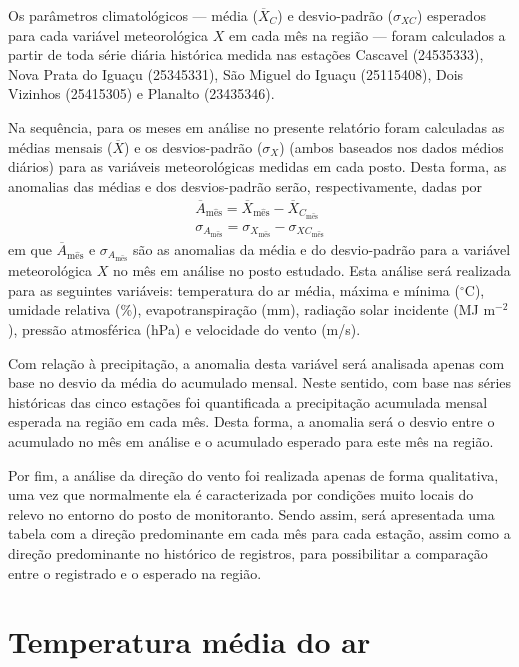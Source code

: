 \documentclass[a4paper,12pt]{article}
\begin{document}
Os parâmetros climatológicos --- média ($\overline{X}_C$) e desvio-padrão ($\sigma_{XC}$)
esperados para cada variável meteorológica $X$ em
cada mês na região --- foram calculados a partir de toda série diária histórica medida
nas estações Cascavel (24535333), Nova Prata do Iguaçu (25345331), São Miguel do Iguaçu (25115408),
Dois Vizinhos (25415305) e Planalto (23435346).

Na sequência, para os meses em análise no presente relatório foram calculadas as médias mensais ($\overline{X}$) e os
desvios-padrão ($\sigma_X$) (ambos baseados nos dados médios diários) para as variáveis meteorológicas medidas em cada posto.
Desta forma, as anomalias das médias e dos desvios-padrão serão, respectivamente, dadas por
%
\begin{align*}
\overline{A}_{\mathrm{m\hat{e}s}} = \overline{X}_{\mathrm{m\hat{e}s}} - \overline{X}_{C_{\mathrm{m\hat{e}s}}} \\
\sigma_{A_\mathrm{m\hat{e}s}} = \sigma_{X_\mathrm{m\hat{e}s}} - \sigma_{XC_\mathrm{m\hat{e}s}}
\end{align*}
%
em que $\overline{A}_\mathrm{m\hat{e}s}$ e $\sigma_{A_\mathrm{m\hat{e}s}}$  são as anomalias da média e do
desvio-padrão para a variável meteorológica $X$ no mês em análise
no posto estudado. Esta análise será realizada para as seguintes variáveis: temperatura do ar média, máxima
e mínima ($^\circ$C),
umidade relativa (\%), evapotranspiração (mm), radiação solar incidente (MJ m$^{-2}$),
pressão atmosférica (hPa) e velocidade do vento (m/s).

Com relação à precipitação, a anomalia desta variável será analisada apenas com base no desvio da média do acumulado mensal. Neste sentido,
com base nas séries históricas das cinco estações foi quantificada a precipitação acumulada mensal
esperada na região em cada mês. Desta forma, a anomalia será o desvio entre o acumulado no mês
em análise e o acumulado esperado para este mês na região.

Por fim, a análise da direção do vento foi realizada apenas de forma qualitativa, uma vez que normalmente
ela é caracterizada por condições muito locais do relevo no entorno do posto de monitoranto. Sendo assim, será
apresentada uma tabela com a direção predominante em cada mês para cada estação, assim como a direção predominante no histórico
de registros, para possibilitar a comparação entre o registrado e o esperado na região.



\newpage


        \section{Temperatura média do ar }
\end{document}
